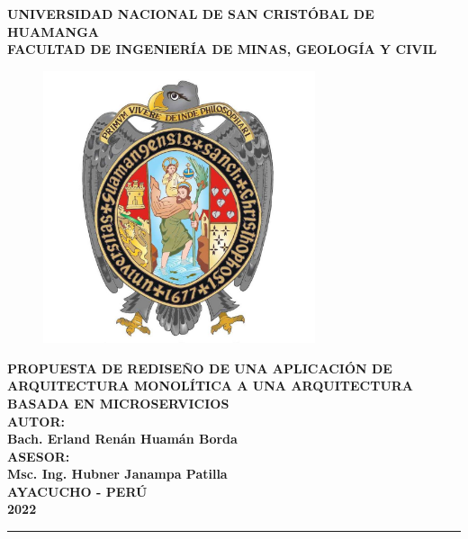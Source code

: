 \begin{titlepage}

\centering
  { \fontsize{18pt}{\baselineskip}\selectfont \textbf{UNIVERSIDAD NACIONAL DE SAN CRISTÓBAL DE HUAMANGA} }\\[0.25cm]
  { \fontsize{16pt}{\baselineskip}\selectfont \textbf{FACULTAD DE INGENIERÍA DE MINAS, GEOLOGÍA Y CIVIL} }\\[0.25cm]

  \begin{figure}[htb]
    \centering
    \includegraphics[height=8cm]{src/assets/unsch_logo.jpg}
  \end{figure}

\vspace{0.5cm}
{\fontsize{14pt}{ \baselineskip}\selectfont \textbf{
  PROPUESTA DE REDISEÑO DE UNA APLICACIÓN DE ARQUITECTURA MONOLÍTICA A UNA ARQUITECTURA BASADA EN
  MICROSERVICIOS
}}\\[0.5cm]
{\fontsize{14pt}{ \baselineskip}\selectfont \textbf{AUTOR:}}\\[0.5cm]
{\fontsize{14pt}{ \baselineskip}\selectfont \textbf{Bach. Erland Renán Huamán Borda}}\\[0.5cm]
{\fontsize{14pt}{ \baselineskip}\selectfont \textbf{ASESOR:}}\\[0.5cm]
{\fontsize{14pt}{ \baselineskip}\selectfont \textbf{Msc. Ing. Hubner Janampa Patilla}}\\[0.5cm]

\vfill
{\fontsize{14pt}{ \baselineskip}\selectfont \textbf{AYACUCHO - PERÚ}}\\[0.5cm]
{\fontsize{14pt}{ \baselineskip}\selectfont \textbf{2022}}
\singlespacing
\rule{132mm}{0.25mm}\\

\end{titlepage}
\restoregeometry
\newpage
